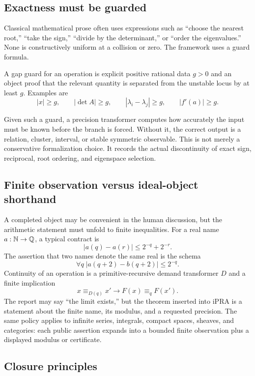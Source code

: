 \subsection{Exactness must be guarded}

Classical mathematical prose often uses expressions such as ``choose the nearest root,'' ``take the sign,''
``divide by the determinant,'' or ``order the eigenvalues.''  None is constructively uniform at a
collision or zero.  The framework uses a guard formula.

\begin{definition}
A gap guard for an operation is explicit positive rational data \(g>0\) and an object proof that the relevant
quantity is separated from the unstable locus by at least \(g\).  Examples are
\[
 |x|\ge g,
 \qquad |\det A|\ge g,
 \qquad |\lambda_i-\lambda_j|\ge g,
 \qquad |f'(a)|\ge g.
\]
\end{definition}

Given such a guard, a precision transformer computes how accurately the input must be known before the
branch is forced.  Without it, the correct output is a relation, cluster, interval, or stable symmetric
observable.  This is not merely a conservative formalization choice.  It records the actual discontinuity
of exact sign, reciprocal, root ordering, and eigenspace selection.

\subsection{Finite observation versus ideal-object shorthand}

A completed object may be convenient in the human discussion, but the arithmetic statement must unfold to
finite inequalities.  For a real name \(a:\mathbb N\to\mathbb Q\), a typical contract is
\[
 |a(q)-a(r)|\le 2^{-q}+2^{-r}.
\]
The assertion that two names denote the same real is the schema
\[
 \forall q\; |a(q+2)-b(q+2)|\le 2^{-q}.
\]
Continuity of an operation is a primitive-recursive demand transformer \(D\) and a finite implication
\[
 x\equiv_{D(q)}x'\to F(x)\equiv_q F(x').
\]
The report may say ``the limit exists,'' but the theorem inserted into iPRA is a statement about the finite
name, its modulus, and a requested precision.  The same policy applies to infinite series, integrals,
compact spaces, sheaves, and categories: each public assertion expands into a bounded finite observation
plus a displayed modulus or certificate.

\subsection{Closure principles}

